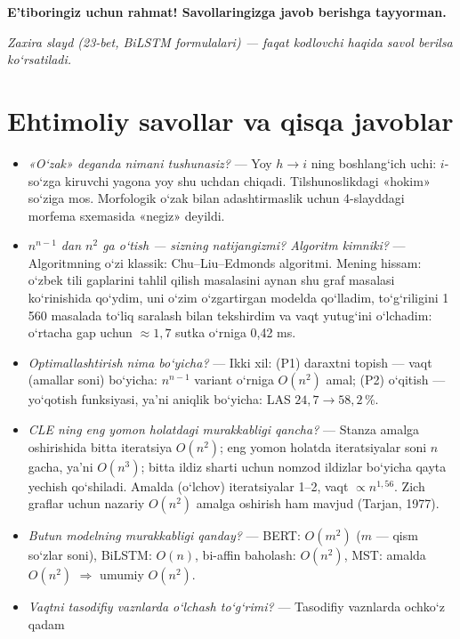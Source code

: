 \documentclass[14pt,a4paper]{extarticle}
\let\origsection\section
\renewcommand{\section}{\Needspace*{9\baselineskip}\origsection}
\newcommand{\say}[1]{\textbf{#1}}
\begin{document}
\say{E’tiboringiz uchun rahmat! Savollaringizga javob berishga tayyorman.}

{\small\itshape Zaxira slayd (23-bet, BiLSTM formulalari) --- faqat kodlovchi haqida savol
berilsa ko‘rsatiladi.}

\newpage
\section*{Ehtimoliy savollar va qisqa javoblar}

\begin{itemize}
  \item \textit{«O‘zak» deganda nimani tushunasiz?} --- Yoy $h\to i$ ning boshlang‘ich uchi:
        $i$-so‘zga kiruvchi yagona yoy shu uchdan chiqadi. Tilshunoslikdagi «hokim» so‘ziga mos.
        Morfologik o‘zak bilan adashtirmaslik uchun 4-slayddagi morfema sxemasida «negiz» deyildi.
  \item \textit{$n^{n-1}$ dan $n^2$ ga o‘tish --- sizning natijangizmi? Algoritm kimniki?} ---
        Algoritmning o‘zi klassik: Chu--Liu--Edmonds algoritmi. Mening hissam: o‘zbek tili
        gaplarini tahlil qilish masalasini aynan shu graf masalasi ko‘rinishida qo‘ydim, uni o‘zim
        o‘zgartirgan modelda qo‘lladim, to‘g‘riligini 1\,560 masalada to‘liq saralash bilan
        tekshirdim va vaqt yutug‘ini o‘lchadim: o‘rtacha gap uchun $\approx1{,}7$ sutka o‘rniga 0,42 ms.
  \item \textit{Optimallashtirish nima bo‘yicha?} --- Ikki xil: (P1) daraxtni topish --- vaqt
        (amallar soni) bo‘yicha: $n^{n-1}$ variant o‘rniga $O(n^2)$ amal; (P2) o‘qitish --- yo‘qotish
        funksiyasi, ya’ni aniqlik bo‘yicha: LAS $24{,}7\to58{,}2\,\%$.
  \item \textit{CLE ning eng yomon holatdagi murakkabligi qancha?} --- Stanza amalga oshirishida
        bitta iteratsiya $O(n^2)$; eng yomon holatda iteratsiyalar soni $n$ gacha, ya’ni $O(n^3)$;
        bitta ildiz sharti uchun nomzod ildizlar bo‘yicha qayta yechish qo‘shiladi. Amalda (o‘lchov)
        iteratsiyalar 1--2, vaqt $\propto n^{1,56}$. Zich graflar uchun nazariy $O(n^2)$ amalga
        oshirish ham mavjud (Tarjan, 1977).
  \item \textit{Butun modelning murakkabligi qanday?} --- BERT: $O(m^2)$ ($m$ --- qism so‘zlar soni),
        BiLSTM: $O(n)$, bi-affin baholash: $O(n^2)$, MST: amalda $O(n^2)$ $\Rightarrow$ umumiy $O(n^2)$.
  \item \textit{Vaqtni tasodifiy vaznlarda o‘lchash to‘g‘rimi?} --- Tasodifiy vaznlarda ochko‘z qadam

\end{itemize}
\end{document}
